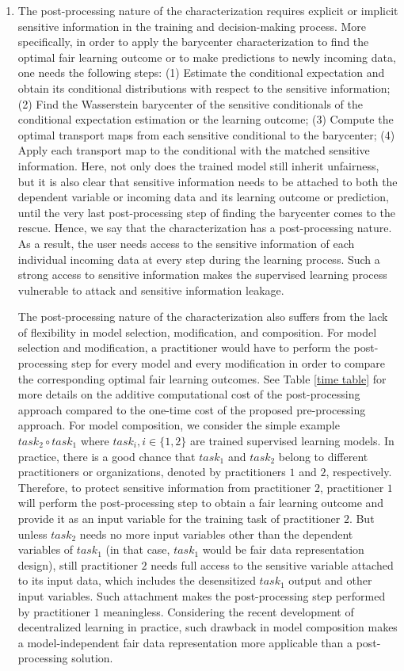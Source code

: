 \documentclass[twoside,11pt]{article}
\begin{document}
\begin{enumerate}
\item The post-processing nature of the characterization requires explicit or implicit sensitive information in the training and decision-making process. More specifically, in order to apply the barycenter characterization to find the optimal fair learning outcome or to make predictions to newly incoming data, one needs the following steps: (1) Estimate the conditional expectation and obtain its conditional distributions with respect to the sensitive information; (2) Find the Wasserstein barycenter of the sensitive conditionals of the conditional expectation estimation or the learning outcome; (3) Compute the optimal transport maps from each sensitive conditional to the barycenter; (4) Apply each transport map to the conditional with the matched sensitive information. Here, not only does the trained model still inherit unfairness, but it is also clear that sensitive information needs to be attached to both the dependent variable or incoming data and its learning outcome or prediction, until the very last post-processing step of finding the barycenter comes to the rescue. Hence, we say that the characterization has a post-processing nature. As a result, the user needs access to the sensitive information of each individual incoming data at every step during the learning process. Such a strong access to sensitive information makes the supervised learning process vulnerable to attack and sensitive information leakage.

The post-processing nature of the characterization also suffers from the lack of flexibility in model selection, modification, and composition. For model selection and modification, a practitioner would have to perform the post-processing step for every model and every modification in order to compare the corresponding optimal fair learning outcomes. See Table \ref{time table} for more details on the additive computational cost of the post-processing approach compared to the one-time cost of the proposed pre-processing approach. For model composition, we consider the simple example $task_2 \circ task_1$ where $task_i, i \in \{1,2\}$ are trained supervised learning models. In practice, there is a good chance that $task_1$ and $task_2$ belong to different practitioners or organizations, denoted by practitioners $1$ and $2$, respectively. Therefore, to protect sensitive information from practitioner $2$, practitioner $1$ will perform the post-processing step to obtain a fair learning outcome and provide it as an input variable for the training task of practitioner $2$. But unless $task_2$ needs no more input variables other than the dependent variables of $task_1$ (in that case, $task_1$ would be fair data representation design), still practitioner $2$ needs full access to the sensitive variable attached to its input data, which includes the desensitized $task_1$ output and other input variables. Such attachment makes the post-processing step performed by practitioner $1$ meaningless. Considering the recent development of decentralized learning in practice, such drawback in model composition makes a model-independent fair data representation more applicable than a post-processing solution.


\end{enumerate}
\end{document}
